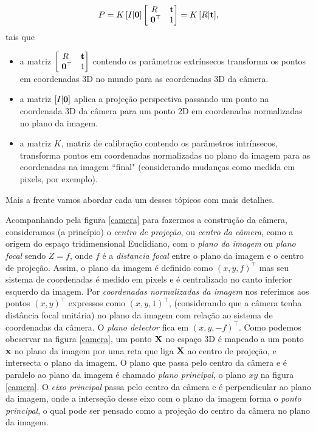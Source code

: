 \begin{equation*}
P = K \, [I|{\bf 0}]
\begin{bmatrix}
R&{\bf t}\\
\,\,{\bf 0}^\top &1
\end{bmatrix}
= K\,[R|{\bf t}],
\end{equation*}
tais que 

\begin{itemize}
\item a matriz $\begin{bmatrix}
R&{\bf t}\\
\,\,{\bf 0}^\top &1
\end{bmatrix}$
contendo os parâmetros extrínsecos transforma os pontos em coordenadas 3D no mundo para as coordenadas 3D da câmera.
\item a matriz $[I|{\bf 0}]$ aplica a projeção perspectiva passando um ponto na coordenada 3D da câmera para um ponto 2D em coordenadas normalizadas no plano da imagem.
\item a matriz $K$, matriz de calibração contendo os parâmetros intrínsecos, transforma pontos em coordenadas normalizadas no plano da imagem para as coordenadas na imagem ``final" (considerando mudanças como medida em pixels, por exemplo).  
\end{itemize}
Mais a frente vamos abordar cada um desses tópicos com mais detalhes.

Acompanhando pela figura \ref{camera} para fazermos a construção da câmera, consideramos (a princípio) o \textit{centro de projeção}, ou \textit{centro da câmera}, como a origem do espaço tridimensional Euclidiano, com o \textit{plano da imagem} ou \textit{plano focal} sendo $Z = f$, onde $f$ é a \textit{distancia focal} entre o plano da imagem e o centro de projeção. Assim, o plano da imagem é definido como $(x,y,f)^\top$ mas seu sistema de coordenadas é medido em pixels e é centralizado no canto inferior esquerdo da imagem. Por \textit{coordenadas normalizadas da imagem} nos referimos aos pontos $(x,y)^\top$ expressos como $(x,y,1)^\top$, (considerando que a câmera tenha distância focal unitária) no plano da imagem com relação ao sistema de coordenadas da câmera. O \textit{plano detector} fica em $(x,y,-f)^\top$. Como podemos obeservar na figura \ref{camera}, um ponto $\mathbf{X}$ no espaço 3D é mapeado a um ponto $\mathbf{x}$ no plano da imagem por uma reta que liga $\mathbf{X}$ ao centro de projeção, e intersecta o plano da imagem. O plano que passa pelo centro da câmera e é paralelo ao plano da imagem é chamado \textit{plano principal}, o plano $xy$ na figura \ref{camera}. O \textit{eixo principal} passa pelo centro da câmera e é perpendicular ao plano da imagem, onde a interseção desse eixo com o plano da imagem forma o \textit{ponto principal}, o qual pode ser pensado como a projeção do centro da câmera no plano da imagem.


